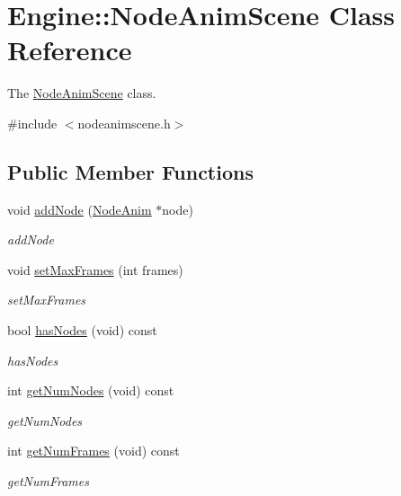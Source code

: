 \hypertarget{classEngine_1_1NodeAnimScene}{}\section{Engine\+:\+:Node\+Anim\+Scene Class Reference}
\label{classEngine_1_1NodeAnimScene}


The \hyperlink{classEngine_1_1NodeAnimScene}{Node\+Anim\+Scene} class.  




{\ttfamily \#include $<$nodeanimscene.\+h$>$}

\subsection*{Public Member Functions}
\begin{DoxyCompactItemize}
\item 
void \hyperlink{classEngine_1_1NodeAnimScene_ab40c73ecf505129e8cfaf65a5fa7968a}{add\+Node} (\hyperlink{classEngine_1_1NodeAnim}{Node\+Anim} $\ast$node)
\begin{DoxyCompactList}\small\item\em add\+Node \end{DoxyCompactList}\item 
void \hyperlink{classEngine_1_1NodeAnimScene_a26a3ae9cb5c7a42e7fdcf1609b93ad8d}{set\+Max\+Frames} (int frames)
\begin{DoxyCompactList}\small\item\em set\+Max\+Frames \end{DoxyCompactList}\item 
bool \hyperlink{classEngine_1_1NodeAnimScene_a7565e0b231a173e75c1248662dbca9ea}{has\+Nodes} (void) const 
\begin{DoxyCompactList}\small\item\em has\+Nodes \end{DoxyCompactList}\item 
int \hyperlink{classEngine_1_1NodeAnimScene_a4c562c44c4c37479a75ca90e11ac0016}{get\+Num\+Nodes} (void) const 
\begin{DoxyCompactList}\small\item\em get\+Num\+Nodes \end{DoxyCompactList}\item 
int \hyperlink{classEngine_1_1NodeAnimScene_aceb00c5d0002f00046cacb33f7ab9b8b}{get\+Num\+Frames} (void) const 
\begin{DoxyCompactList}\small\item\em get\+Num\+Frames \end{DoxyCompactList}\item 

\end{DoxyCompactItemize}
